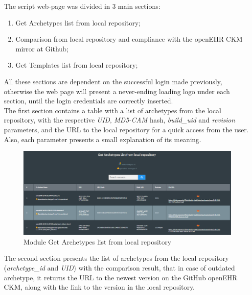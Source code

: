 \documentclass[mim_thesis.tex]{subfiles}
\begin{document}
The script web-page was divided in 3 main sections: 

\begin{enumerate}[noitemsep]
\item Get Archetypes list from local repository;
\item Comparison from local repository and compliance with the openEHR CKM mirror at Github;
\item Get Templates list from local repository; 
\end{enumerate}

All these sections are dependent on the successful login made previously, otherwise the web page will present a never-ending loading logo under each section, until the login credentials are correctly inserted. \\

The first section contains a table with a list of archetypes from the local repository, with the respective \textit{UID}, \textit{MD5-CAM} hash, \textit{build\_uid} and \textit{revision} parameters, and the URL to the local repository for a quick access from the user. Also, each parameter presents a small explanation of its meaning. 

\begin{figure}[H]
	\centering
    \includegraphics[width=1\textwidth]{img/get_arch_list.PNG}
	\caption{Module Get Archetypes list from local repository }
	\label{fig:get_arch_list}
\end{figure}

The second section presents the list of archetypes from the local repository (\textit{archetype\_id} and \textit{UID}) with the comparison result, that in case of outdated archetype, it returns the URL to the newest version on the GitHub openEHR CKM, along with the link to the version in the local repository. 
\end{document}

